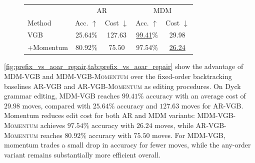 \documentclass{article}
\numberwithin{theorem}{section}
\numberwithin{proposition}{section}
\numberwithin{corollary}{section}
\numberwithin{lemma}{section}
\numberwithin{conjecture}{section}
\numberwithin{remark}{section}
\numberwithin{definition}{section}
\numberwithin{assumption}{section}
\numberwithin{example}{section}
\begin{document}
\begin{figure}[t]
\begin{minipage}[t]{0.49\linewidth}
{
}
\label{fig:prefix_vs_aoar_repair}
\end{minipage}
\hfill
\begin{minipage}[t]{0.47\linewidth}
\vspace{0pt}
\centering
{\scriptsize
\setlength{\tabcolsep}{3.5pt}
\renewcommand{\arraystretch}{1.05}
\begin{tabular}{lcccc}
\toprule
& \multicolumn{2}{c}{\textsc{AR}} & \multicolumn{2}{c}{\textsc{MDM}} \\
\cmidrule(lr){2-3}\cmidrule(lr){4-5}
Method
& Acc. $\uparrow$
& Cost $\downarrow$
& Acc. $\uparrow$
& Cost $\downarrow$ \\
\midrule
VGB
& 25.64\%
& 127.63
& \underline{99.41}\%
& 29.98 \\
+Momentum
& 80.92\%
& 75.50
& 97.54\%
& \underline{26.24} \\
\bottomrule
\end{tabular}
}
\vspace{3pt}
\label{tab:prefix_vs_aoar_repair}
\vspace{-15pt}
\end{minipage}

\end{figure}

\cref{fig:prefix_vs_aoar_repair,tab:prefix_vs_aoar_repair} show the advantage of \textsc{MDM-VGB} and \textsc{MDM-VGB-Momentum} over the fixed-order backtracking baselines \textsc{AR-VGB} and \textsc{AR-VGB-Momentum} as editing procedures. On Dyck
grammar editing, \textsc{MDM-VGB} reaches \(99.41\%\) accuracy with an average
cost of \(29.98\) moves, compared with \(25.64\%\) accuracy and \(127.63\)
moves for \textsc{AR-VGB}. Momentum reduces edit cost for both AR and MDM variants: \textsc{MDM-VGB-Momentum}
achieves \(97.54\%\) accuracy with \(26.24\) moves, while
\textsc{AR-VGB-Momentum} reaches \(80.92\%\) accuracy with \(75.50\) moves. For MDM-VGB, momentum trades a small drop in accuracy for fewer moves, while the any-order variant remains substantially more efficient overall.
\end{document}
